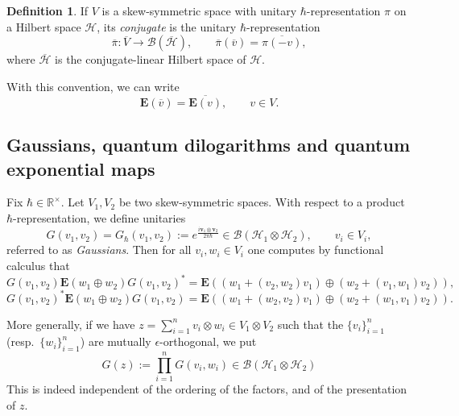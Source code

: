 \documentclass[11pt, reqno]{amsart}
\theoremstyle{definition}
\newtheorem{defn}[theorem]{Definition}
\numberwithin{equation}{section}
\def\R{\mathbb R}
\newcommand{\Hsp}{\mathcal{H}}
\newcommand{\Bc}{\mathcal{B}}
\newcommand{\vb}{\mathbf{v}}
\newcommand{\eb}{\mathbf{E}}
\newcommand{\Gauss}{G}
\begin{document}
\begin{defn}
If $V$ is a skew-symmetric space with unitary $\hbar$-representation $\pi$ on a Hilbert space $\Hsp$, its \emph{conjugate} is the unitary $\hbar$-representation
\begin{equation}\label{EqDirSumRepUnit2}
\overline{\pi}\colon \overline{V}\rightarrow \Bc(\overline{\Hsp}),\qquad \overline{\pi}(\overline{v}) = \overline{\pi(-v)},
\end{equation}
where $\overline{\Hsp}$ is the conjugate-linear Hilbert space of $\Hsp$.
\end{defn}
With this convention, we can write 
\begin{equation}\label{EqComplexConjj}
\eb(\overline{v}) = \overline{\eb(v)},\qquad v\in V.
\end{equation}



\subsection{Gaussians, quantum dilogarithms and quantum exponential maps}

Fix $\hbar\in \R^{\times}$. Let $V_1,V_2$ be two skew-symmetric spaces. With respect to a product $\hbar$-representation, we define unitaries 
\begin{equation}\label{EqGausDef}
\Gauss(v_1,v_2) = \Gauss_{\hbar}(v_1,v_2) :=e^{\frac{i \vb_1\otimes \vb_2}{2\pi \hbar}} \in \Bc(\Hsp_1 \otimes \Hsp_2),\qquad v_i \in V_i,
\end{equation}
referred to as \emph{Gaussians}. Then for all $v_i,w_i\in V_i$ one computes by functional calculus that
\begin{equation}\label{EqGausEq}
\Gauss(v_1,v_2) \eb(w_1\oplus w_2) \Gauss(v_1,v_2)^* = \eb((w_1+(v_2,w_2)v_1) \oplus (w_2+(v_1,w_1)v_2)),
\end{equation}
\begin{equation}\label{EqGausEqInv}
\Gauss(v_1,v_2)^* \eb(w_1\oplus w_2) \Gauss(v_1,v_2) = \eb((w_1+(w_2,v_2)v_1) \oplus (w_2+(w_1,v_1)v_2)).
\end{equation}

More generally, if we have $z = \sum_{i=1}^n v_i \otimes w_i \in V_1\otimes V_2$ such that the $\{v_i\}_{i=1}^n$ (resp.\ $\{w_i\}_{i=1}^n$) are mutually $\epsilon$-orthogonal, we put
\begin{equation}\label{EqGenTens}
\Gauss(z) := \prod_{i=1}^n \Gauss(v_i,w_i) \in \Bc(\Hsp_1 \otimes \Hsp_2)
\end{equation}
This is indeed independent of the ordering of the factors, and of the presentation of $z$. 
\end{document}
